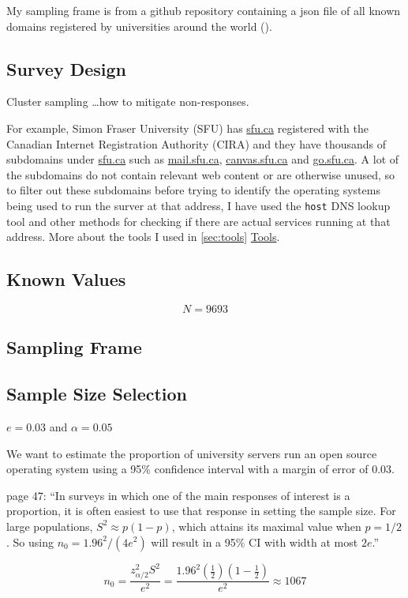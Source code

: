 \documentclass{article}
\theoremstyle{definition}
\begin{document}
\begin{flushleft}
My sampling frame is from a github repository containing
a json file of all known domains registered by
universities around the world (\cite{Hipo}).

\subsection{Survey Design}
Cluster sampling \dots how to mitigate non-responses.

For example, Simon Fraser University (SFU) has \url{sfu.ca} registered with
the Canadian Internet Registration Authority (CIRA) and
they have thousands of subdomains under \url{sfu.ca} such as \url{mail.sfu.ca},
\url{canvas.sfu.ca} and \url{go.sfu.ca}. A lot of the subdomains do not
contain relevant web content or are otherwise unused, so to filter out these
subdomains before trying to identify the operating systems being
used to run the surver at that address, I have used the \texttt{host} DNS
lookup tool and other methods for checking if there are actual services running
at that address. More about the tools I used in \autoref{sec:tools} \hyperref[sec:tools]{Tools}.

\subsection{Known Values}
$$
	N=9693
$$

\subsection{Sampling Frame}


\subsection{Sample Size Selection}
$e=0.03$ and $\alpha=0.05$ \cite{lohr2019}

We want to estimate the proportion of university servers
run an open source operating system using a 95\% confidence
interval with a margin of error of 0.03.

\cite{lohr2019} page 47:
``In surveys in which one of the main responses of interest
is a proportion, it is often easiest to use that response
in setting the sample size.
For large populations, $S^2 \approx p(1-p)$, which
attains its maximal value when $p=1/2$. So using
$n_0=1.96^2/(4e^2)$ will result in a 95\% CI with width at most
$2e$.''

$$
	n_0
	=
	\frac{
		z^2_{\alpha/2}S^2
	}{
		e^2
	}
	=
	\frac{
		1.96^2(\frac{1}{2})(1-\frac{1}{2})
	}{
		e^2
	}
	\approx
	1067
$$


\end{flushleft}
\end{document}
